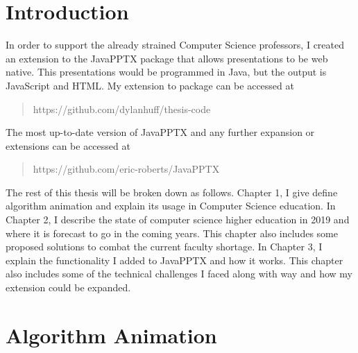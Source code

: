 \documentclass[12pt,twoside]{reedthesis}
\begin{document}

    \chapter*{Introduction}
	In order to support the already strained Computer Science professors, I created an extension to the JavaPPTX package that allows presentations to be web native. This presentations would be programmed in Java, but the output is JavaScript and HTML. My extension to package can be accessed at \begin{quote} https://github.com/dylanhuff/thesis-code \end{quote} The most up-to-date version of JavaPPTX and any further expansion or extensions can be accessed at \begin{quote} https://github.com/eric-roberts/JavaPPTX \end{quote} The rest of this thesis will be broken down as follows. Chapter 1, I give define algorithm animation and explain its usage in Computer Science education. In Chapter 2, I describe the state of computer science higher education in 2019 and where it is forecast to go in the coming years. This chapter also includes some proposed solutions to combat the current faculty shortage. In Chapter 3, I explain the functionality I added to JavaPPTX and how it works. This chapter also includes some of the technical challenges I faced along with way and how my extension could be expanded. 
	
\chapter{Algorithm Animation}
	
\end{document}
